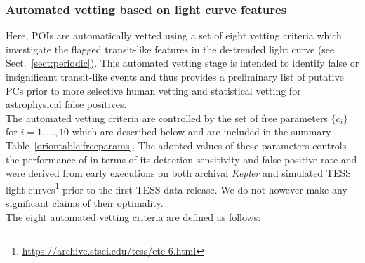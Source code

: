 \subsubsection{Automated vetting based on light curve features} \label{sect:autovetting}
Here, POIs are automatically vetted using a set of eight vetting criteria which investigate
the flagged transit-like features in the de-trended light curve (see Sect.~\ref{sect:periodic}).
This automated vetting stage is intended to identify false or insignificant transit-like events
and thus provides a preliminary list of putative PCs prior to more selective human vetting
and statistical vetting for astrophysical false positives. \\

The automated vetting criteria are controlled by the set of free parameters
$\{c_i\}$ for $i=1,\dots,10$ which are described below and are included in the
summary Table~\ref{oriontable:freeparams}.
The adopted values of these parameters controls the performance of \pipeline{} in terms of its
detection sensitivity and false positive rate and were derived
from early \pipeline{} executions on both archival \emph{Kepler} and simulated TESS light
curves\footnote{\url{https://archive.stsci.edu/tess/ete-6.html}} prior to the first TESS data
release. We do not however make any significant claims of their optimality. \\

The eight automated vetting criteria are defined as follows:

